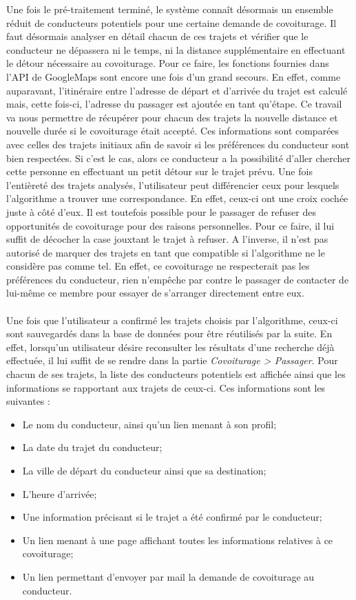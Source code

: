 \documentclass[12pt, a4paper, oneside]{article}
\begin{document}
     \indent Une fois le pré-traitement terminé, le système connaît désormais un ensemble réduit de conducteurs potentiels pour une certaine demande de covoiturage. Il faut désormais analyser en détail chacun de ces trajets et vérifier que le conducteur ne dépassera ni le temps, ni la distance supplémentaire en effectuant le détour nécessaire au covoiturage. Pour ce faire, les fonctions fournies dans l'API de GoogleMaps sont encore une fois d'un grand secours. En effet, comme auparavant, l'itinéraire entre l'adresse de départ et d'arrivée du trajet est calculé mais, cette fois-ci, l'adresse du passager est ajoutée en tant qu'étape. Ce travail va nous permettre de récupérer pour chacun des trajets la nouvelle distance et nouvelle durée si le covoiturage était accepté. Ces informations sont comparées avec celles des trajets initiaux afin de savoir si les préférences du conducteur sont bien respectées. Si c'est le cas, alors ce conducteur a la possibilité d'aller chercher cette personne en effectuant un petit détour sur le trajet prévu. Une fois l'entièreté des trajets analysés, l'utilisateur peut différencier ceux pour lesquels l'algorithme a trouver une correspondance. En effet, ceux-ci ont une croix cochée juste à côté d'eux. Il est toutefois possible pour le passager de refuser des opportunités de covoiturage pour des raisons personnelles. Pour ce faire, il lui suffit de décocher la case jouxtant le trajet à refuser. A l'inverse, il n'est pas autorisé de marquer des trajets en tant que compatible si l'algorithme ne le considère pas comme tel. En effet, ce covoiturage ne respecterait pas les préférences du conducteur, rien n'empêche par contre le passager de contacter de lui-même ce membre pour essayer de s'arranger directement entre eux.\\\\
     \indent Une fois que l'utilisateur a confirmé les trajets choisis par l'algorithme, ceux-ci sont sauvegardés dans la base de données pour être réutilisés par la suite. En effet, lorsqu'un utilisateur désire reconsulter les résultats d'une recherche déjà effectuée, il lui suffit de se rendre dans la partie \textit{Covoiturage > Passager}. Pour chacun de ses trajets, la liste des conducteurs potentiels est affichée ainsi que les informations se rapportant aux trajets de ceux-ci. Ces informations sont les suivantes :
     \begin{itemize}
        \item Le nom du conducteur, ainsi qu'un lien menant à son profil;
        \item La date du trajet du conducteur;
        \item La ville de départ du conducteur ainsi que sa destination;
        \item L'heure d'arrivée;
        \item Une information précisant si le trajet a été confirmé par le conducteur;
        \item Un lien menant à une page affichant toutes les informations relatives à ce covoiturage;
        \item Un lien permettant d'envoyer par mail la demande de covoiturage au conducteur.\\
     \end{itemize}
\end{document}
